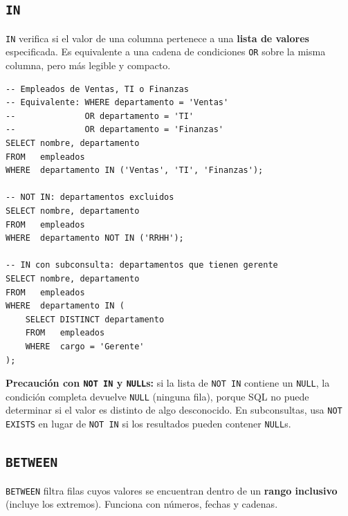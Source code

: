 \subsection{\texttt{IN}}

\texttt{IN} verifica si el valor de una columna pertenece a una
\textbf{lista de valores} especificada.
Es equivalente a una cadena de condiciones \texttt{OR} sobre la
misma columna, pero más legible y compacto.

\begin{lstlisting}[caption={IN con lista de valores literales.}]
-- Empleados de Ventas, TI o Finanzas
-- Equivalente: WHERE departamento = 'Ventas'
--              OR departamento = 'TI'
--              OR departamento = 'Finanzas'
SELECT nombre, departamento
FROM   empleados
WHERE  departamento IN ('Ventas', 'TI', 'Finanzas');

-- NOT IN: departamentos excluidos
SELECT nombre, departamento
FROM   empleados
WHERE  departamento NOT IN ('RRHH');

-- IN con subconsulta: departamentos que tienen gerente
SELECT nombre, departamento
FROM   empleados
WHERE  departamento IN (
    SELECT DISTINCT departamento
    FROM   empleados
    WHERE  cargo = 'Gerente'
);
\end{lstlisting}

\begin{nota}
\textbf{Precaución con \texttt{NOT IN} y \texttt{NULL}s:}
si la lista de \texttt{NOT IN} contiene un \texttt{NULL},
la condición completa devuelve \texttt{NULL} (ninguna fila),
porque SQL no puede determinar si el valor es distinto de algo
desconocido.
En subconsultas, usa \texttt{NOT EXISTS} en lugar de \texttt{NOT IN}
si los resultados pueden contener \texttt{NULL}s.
\end{nota}

\subsection{\texttt{BETWEEN}}

\texttt{BETWEEN} filtra filas cuyos valores se encuentran dentro
de un \textbf{rango inclusivo} (incluye los extremos).
Funciona con números, fechas y cadenas.


